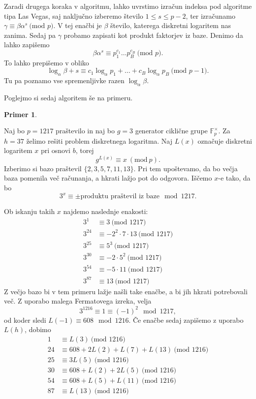 \documentclass[12pt,a4paper,twoside]{article}
\theoremstyle{definition} %
\newtheorem{primer}[definicija]{Primer}
\theoremstyle{plain} %
\numberwithin{equation}{section}  %
\newcommand{\F}{\mathbb F}
\newcommand{\MOD}[1]{\ \text{(mod }{#1}\text{)}}
\begin{document}
Zaradi drugega koraka v algoritmu, lahko uvrstimo izračun indeksa pod algoritme tipa Las Vegas, saj naključno izberemo število $1\leq s \leq p-2$, ter izračunamo $\gamma \equiv \beta \alpha^s \MOD{p}$. V tej enačbi je $\beta$ število, katerega diskretni logaritem nas zanima. Sedaj pa $\gamma$ probamo zapisati kot produkt faktorjev iz baze. Denimo da lahko zapišemo
$$\beta \alpha^s \equiv  p_1^{c_1}\ldots p_B^{c_B} \MOD{p}.$$
To lahko prepišemo v obliko
$$\log_{\alpha}\beta + s \equiv c_1\log_{\alpha}p_1 + \ldots + c_B\log_{\alpha}p_B \MOD{p-1}.$$
Tu pa poznamo vse spremenljivke razen $\log_{\alpha}\beta$.

Poglejmo si sedaj algoritem še na primeru.
\begin{primer}~

Naj bo $p = 1217$ praštevilo in naj bo $g = 3$ generator ciklične grupe $\F^{\times}_{p}$. Za $h = 37$ želimo rešiti problem diskretnega logaritma. Naj $L(x)$ označuje diskretni logaritem $x$ pri osnovi $b$, torej
$$g^{L(x)} \equiv x \ (\text{mod} \ p).$$
Izberimo si bazo praštevil $\{ 2,3,5,7,11,13 \}$. Pri tem upoštevamo, da bo večja baza pomenila več računanja, a hkrati lažjo pot do odgovora. Iščemo $x$-e  tako, da bo
$$3^x \equiv \pm \text{produktu praštevil iz baze} \mod 1217.$$

Ob iskanju takih $x$ najdemo naslednje enakosti:
\begin{align}
3^1 &\equiv 3 \MOD{1217} \nonumber \\ 
3^{24}  &\equiv -2^2\cdot 7\cdot 13 \MOD{1217} \nonumber \\
3^{25}  &\equiv 5^3 \MOD{1217} \nonumber \\
3^{30}  &\equiv -2 \cdot 5^2 \MOD{1217} \nonumber \\
3^{54}  &\equiv -5\cdot 11 \MOD{1217} \nonumber \\
3^{87}  &\equiv 13 \MOD{1217} \nonumber
\end{align}
Z večjo bazo bi v tem primeru lažje našli take enačbe, a bi jih hkrati potrebovali več.
Z uporabo malega Fermatovega izreka, velja
$$3^{1216} \equiv 1 \equiv (-1)^2 \mod 1217, $$
od koder sledi $L(-1) \equiv 608 \mod 1216$.
Če enačbe sedaj zapišemo z uporabo $L(h)$, dobimo
\begin{align}
1 &\equiv L(3) \MOD{1216} \nonumber \\ 
24&\equiv 608 + 2L(2) + L(7) +L(13) \MOD{1216} \nonumber \\
25 &\equiv 3L(5) \MOD{1216} \nonumber \\
30 &\equiv 608+L(2)+2L(5) \MOD{1216} \nonumber \\
54 &\equiv 608+L(5)+L(11) \MOD{1216} \nonumber \\
87  &\equiv L(13) \MOD{1216}  \nonumber
\end{align}


\end{primer}
\end{document}
